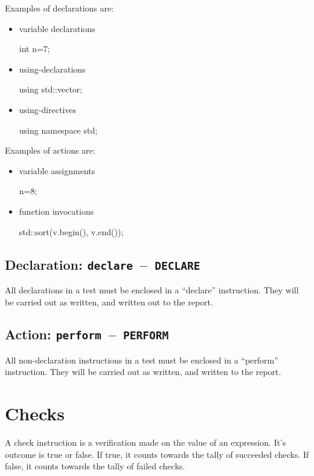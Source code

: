\documentclass[twoside, a4paper, article]{memoir}
\newcommand*\testudocolor{\color{red!80!blue}}
\newcommand*\testudo[1]{\texttt{\testudocolor{}#1}}
\newcommand*\testudopair[2]{\testudo{#1}~--~\testudo{#2}}
\newcommand\subsectiontestudopair[3]{%
  \subsection[#1]{#1: \testudopair{#2}{#3}}}
\providecommand\typesetexample[1]{%
}
\begin{document}
Examples of declarations are:
\begin{itemize}
\item variable declarations
\begin{cpplisting}
int n=7;
\end{cpplisting}

\item using-declarations
\begin{cpplisting}
using std::vector;
\end{cpplisting}

\item using-directives
\begin{cpplisting}
using namespace std;
\end{cpplisting}
\end{itemize}

Examples of actions are:
\begin{itemize}
\item variable assignments
\begin{cpplisting}
n=8;
\end{cpplisting}

\item function invocations
\begin{cpplisting}
std::sort(v.begin(), v.end());
\end{cpplisting}
\end{itemize}

\subsectiontestudopair{Declaration}{declare}{DECLARE}
\label{sec:declaration}

All declarations in a test must be enclosed in a ``declare'' instruction.  They
will be carried out as written, and written out to the report.

\typesetexample{declare}

\subsectiontestudopair{Action}{perform}{PERFORM}
\label{sec:action}

All non-declaration instructions in a test must be enclosed in a ``perform''
instruction.  They will be carried out as written, and written to the report.

\typesetexample{perform}


\section{Checks}
\label{sec:checks}

A check instruction is a verification made on the value of an expression.  It's
outcome is true or false.  If true, it counts towards the tally of succeeded
checks.  If false, it counts towards the tally of failed checks.
\end{document}
